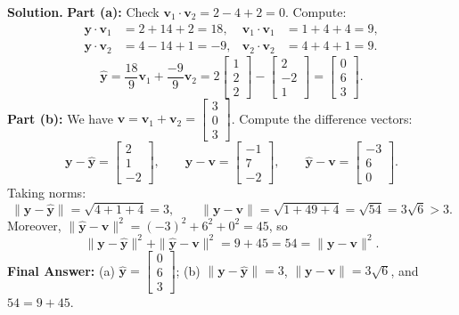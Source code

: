 \documentclass[11pt, letterpaper]{article}
\theoremstyle{definition}
\theoremstyle{remark}
\begin{document}
\textbf{Solution.}
\textbf{Part (a):} Check $\mathbf{v}_1 \cdot \mathbf{v}_2 = 2 - 4 + 2 = 0$. Compute:
\begin{align*}
\mathbf{y} \cdot \mathbf{v}_1 &= 2 + 14 + 2 = 18, & \mathbf{v}_1 \cdot \mathbf{v}_1 &= 1 + 4 + 4 = 9, \\
\mathbf{y} \cdot \mathbf{v}_2 &= 4 - 14 + 1 = -9, & \mathbf{v}_2 \cdot \mathbf{v}_2 &= 4 + 4 + 1 = 9.
\end{align*}
\[
\hat{\mathbf{y}} = \frac{18}{9}\mathbf{v}_1 + \frac{-9}{9}\mathbf{v}_2 = 2\begin{bmatrix} 1 \\ 2 \\ 2 \end{bmatrix} - \begin{bmatrix} 2 \\ -2 \\ 1 \end{bmatrix} = \begin{bmatrix} 0 \\ 6 \\ 3 \end{bmatrix}.
\]
\textbf{Part (b):} We have $\mathbf{v} = \mathbf{v}_1 + \mathbf{v}_2 = \begin{bmatrix} 3 \\ 0 \\ 3 \end{bmatrix}$. Compute the difference vectors:
\[
\mathbf{y} - \hat{\mathbf{y}} = \begin{bmatrix} 2 \\ 1 \\ -2 \end{bmatrix}, \qquad \mathbf{y} - \mathbf{v} = \begin{bmatrix} -1 \\ 7 \\ -2 \end{bmatrix}, \qquad \hat{\mathbf{y}} - \mathbf{v} = \begin{bmatrix} -3 \\ 6 \\ 0 \end{bmatrix}.
\]
Taking norms:
\[
\|\mathbf{y} - \hat{\mathbf{y}}\| = \sqrt{4 + 1 + 4} = 3, \qquad \|\mathbf{y} - \mathbf{v}\| = \sqrt{1 + 49 + 4} = \sqrt{54} = 3\sqrt{6} > 3.
\]
Moreover, $\|\hat{\mathbf{y}} - \mathbf{v}\|^2 = (-3)^2 + 6^2 + 0^2 = 45$, so
\[
\|\mathbf{y} - \hat{\mathbf{y}}\|^2 + \|\hat{\mathbf{y}} - \mathbf{v}\|^2 = 9 + 45 = 54 = \|\mathbf{y} - \mathbf{v}\|^2.
\]
\textbf{Final Answer:} (a) $\hat{\mathbf{y}} = \begin{bmatrix} 0 \\ 6 \\ 3 \end{bmatrix}$; (b) $\|\mathbf{y} - \hat{\mathbf{y}}\| = 3$, $\|\mathbf{y} - \mathbf{v}\| = 3\sqrt{6}$, and $54 = 9 + 45$.
\end{document}
